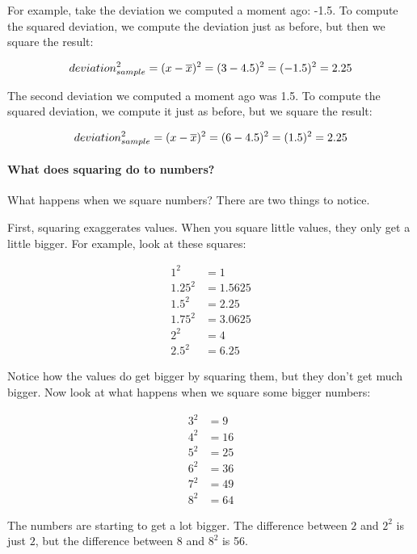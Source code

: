 \documentclass[../../../main.tex]{subfiles}
\begin{document}
For example, take the deviation we computed a moment ago: -1.5. To compute the squared deviation, we compute the deviation just as before, but then we square the result:

\begin{equation*}
  deviation^{2}_{sample} = (x - \overline{x})^{2} = (3 - 4.5)^{2} = (-1.5)^{2} = 2.25
\end{equation*}

The second deviation we computed a moment ago was 1.5. To compute the squared deviation, we compute it just as before, but we square the result:

\begin{equation*}
  deviation^{2}_{sample} = (x - \overline{x})^{2} = (6 - 4.5)^{2} = (1.5)^{2} = 2.25
\end{equation*}


\paragraph{What does squaring do to numbers?}

What happens when we square numbers? There are two things to notice.

First, squaring exaggerates values. When you square little values, they only get a little bigger. For example, look at these squares:

\begin{align*}
  1^{2} &= 1 \\
  1.25^{2} &= 1.5625 \\
  1.5^{2} &= 2.25 \\
  1.75^{2} &= 3.0625 \\
  2^{2} &= 4 \\
  2.5^{2} &= 6.25
\end{align*}

\noindent
Notice how the values do get bigger by squaring them, but they don't get much bigger. Now look at what happens when we square some bigger numbers:

\begin{align*}
  3^{2} &= 9 \\
  4^{2} &= 16 \\
  5^{2} &= 25 \\
  6^{2} &= 36 \\
  7^{2} &= 49 \\
  8^{2} &= 64
\end{align*}

\noindent
The numbers are starting to get a lot bigger. The difference between $2$ and $2^{2}$ is just $2$, but the difference between $8$ and $8^{2}$ is 56. 
\end{document}
